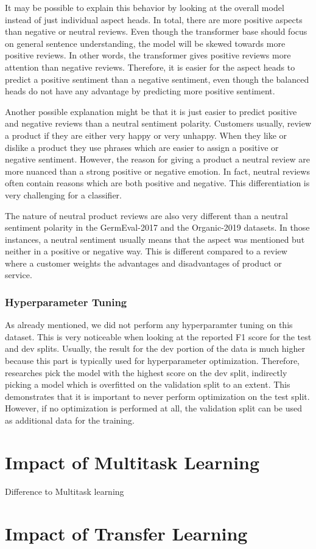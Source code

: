 It may be possible to explain this behavior by looking at the overall model instead of just individual aspect heads. In total, there are more positive aspects than negative or neutral reviews. Even though the transformer base should focus on general sentence understanding, the model will be skewed towards more positive reviews. In other words, the transformer gives positive reviews more attention than negative reviews. Therefore, it is easier for the aspect heads to predict a positive sentiment than a negative sentiment, even though the balanced heads do not have any advantage by predicting more positive sentiment.
\bigskip

Another possible explanation might be that it is just easier to predict positive and negative reviews than a neutral sentiment polarity. Customers usually, review a product if they are either very happy or very unhappy. When they like or dislike a product they use phrases which are easier to assign a positive or negative sentiment. However, the reason for giving a product a neutral review are more nuanced than a strong positive or negative emotion. In fact, neutral reviews often contain reasons which are both positive and negative. This differentiation is very challenging for a classifier. 
\smallskip

The nature of neutral product reviews are also very different than a neutral sentiment polarity in the GermEval-2017 and the Organic-2019 datasets. In those instances, a neutral sentiment usually means that the aspect was mentioned but neither in a positive or negative way. This is different compared to a review where a customer weights the advantages and disadvantages of product or service.

\subsubsection*{Hyperparameter Tuning}

As already mentioned, we did not perform any hyperparamter tuning on this dataset. This is very noticeable when looking at the reported F1 score for the test and dev splits. Usually, the result for the dev portion of the data is much higher because this part is typically used for hyperparameter optimization. Therefore, researches pick the model with the highest score on the dev split, indirectly picking a model which is overfitted on the validation split to an extent. This demonstrates that it is important to never perform optimization on the test split. However, if no optimization is performed at all, the validation split can be used as additional data for the training.  


\section{Impact of Multitask Learning}
\label{sec:06_ResultsMultitask}

Difference to Multitask learning


\section{Impact of Transfer Learning}
\label{sec:06_ResultsTransfer}


